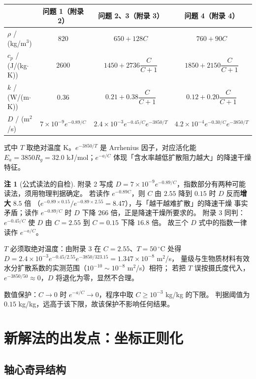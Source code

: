 \documentclass[11pt,a4paper]{article}
\theoremstyle{definition}
\newtheorem{remark}{注}
\begin{document}
\begin{center}
\small
\begin{tabular}{@{}lccc@{}}
\toprule
 & 问题 1（附录 2） & 问题 2、3（附录 3） & 问题 4（附录 4） \\
\midrule
$\rho$ / (kg/m$^3$) & $820$ & $650+128C$ & $760+90C$ \\
$c_p$ / (J/(kg$\cdot$K)) & $2600$ & $1450+2736\dfrac{C}{C+1}$ & $1850+2150\dfrac{C}{C+1}$ \\
$k$ / (W/(m$\cdot$K)) & $0.36$ & $0.21+0.38\dfrac{C}{C+1}$ & $0.12+0.20\dfrac{C}{C+1}$ \\
$D$ / (m$^2$/s) & $7\times10^{-9}e^{-0.89/C}$ &
$2.4\times10^{-3}e^{-0.45/C}e^{-3850/T}$ &
$4.2\times10^{-4}e^{-0.30/C}e^{-3850/T}$ \\
\bottomrule
\end{tabular}
\end{center}
式中 $T$ 取绝对温度 K。$e^{-3850/T}$ 是 Arrhenius 因子，对应活化能
$E_a=3850R_g=32.0$ kJ/mol；$e^{-a/C}$ 体现「含水率越低扩散阻力越大」的降速干燥特征。

\begin{remark}[公式读法的自检]
附录 2 写成 $D=7\times10^{-9}e^{-0.89/C}$，指数部分有两种可能读法，须用物理判据确定。
若读作 $e^{-0.89C}$，则 $C$ 由 $2.55$ 降到 $0.15$ 时 $D$ 反而\textbf{增大} $8.5$ 倍
（$e^{-0.89\times0.15}/e^{-0.89\times2.55}=8.47$），与「越干越难扩散」的降速干燥
事实矛盾；读作 $e^{-0.89/C}$ 时 $D$ 下降 $266$ 倍，正是降速干燥所要求的。
附录 3 同判：$e^{-0.45/C}$ 使 $D$ 由 $C=2.55$ 到 $C=0.15$ 下降 $16.8$ 倍。
故三个 $D$ 式中的指数一律读作 $e^{-a/C}$。

$T$ 必须取绝对温度：由附录 3 在 $C=2.55$、$T=50\,^\circ$C 处得
$D=2.4\times10^{-3}e^{-0.45/2.55}e^{-3850/323.15}=1.347\times10^{-8}$ m$^2$/s，
量级与生物质材料有效水分扩散系数的实测范围（$10^{-10}\sim10^{-8}$ m$^2$/s）相符；
若把 $T$ 误按摄氏度代入，$e^{-3850/50}\approx0$，$D$ 将退化为零，显然不合理。
\end{remark}

数值保护：$C\to0$ 时 $e^{-a/C}\to0$，程序中取 $C\ge10^{-3}$ kg/kg 的下限。
判据阈值为 $0.15$ kg/kg，远高于该下限，故该保护不影响任何结果。

\section{新解法的出发点：坐标正则化}

\subsection{轴心奇异结构}
\end{document}
